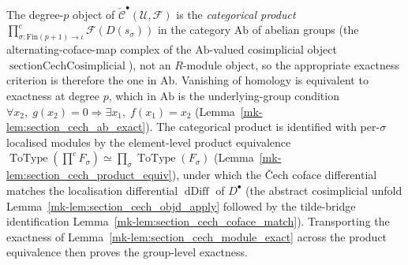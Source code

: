 \begin{lemma}
  The degree-\(p\) object of
  \(\check{\mathcal{C}}^\bullet(\mathcal{U}, \mathcal{F})\) is the \emph{categorical
  product}
  \(\prod^{c}_{\sigma : \mathrm{Fin}(p+1) \to \iota}
  \mathcal{F}(D(s_\sigma))\) in the category \(\mathrm{Ab}\) of abelian groups (the
  alternating-coface-map complex of the \(\mathrm{Ab}\)-valued cosimplicial object
  \(\operatorname{sectionCechCosimplicial}\)), not an \(R\)-module object, so the
  appropriate exactness criterion is therefore the one in \(\mathrm{Ab}\). Vanishing
  of homology is equivalent to exactness at degree \(p\), which in \(\mathrm{Ab}\) is
  the underlying-group condition
  \(\forall x_2,\; g(x_2)=0\Rightarrow\exists x_1,\;f(x_1)=x_2\)
  (Lemma~\ref{mk-lem:section_cech_ab_exact}). The categorical product is identified with
  per-\(\sigma\) localised modules by the element-level product equivalence
  \(\operatorname{ToType}(\prod^{c} F_\sigma) \simeq \prod_\sigma
  \operatorname{ToType}(F_\sigma)\)
  (Lemma~\ref{mk-lem:section_cech_product_equiv}), under which the {\v C}ech coface
  differential matches the localisation differential \(\operatorname{dDiff}\) of
  \(D^\bullet\) (the abstract cosimplicial unfold
  Lemma~\ref{mk-lem:section_cech_objd_apply} followed by the tilde-bridge identification
  Lemma~\ref{mk-lem:section_cech_coface_match}). Transporting the exactness of
  Lemma~\ref{mk-lem:section_cech_module_exact} across the product equivalence then
  proves the group-level exactness.
\end{lemma}

